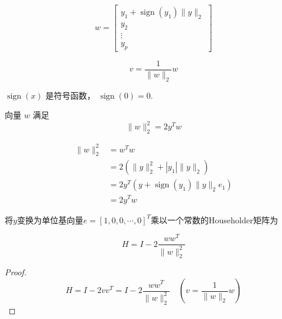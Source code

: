 \begin{definition}
    \begin{equation}w=\left[\begin{array}{c}
        y_{1}+\operatorname{sign}\left(y_{1}\right)\|y\|_{2} \\
        y_{2} \\
        \vdots \\
        y_{p}
        \end{array}\right]\end{equation}

    \begin{equation}v=\frac{1}{\|w\|_{2}} w\end{equation}

    $\operatorname{sign}(x)$ 是符号函数， $\operatorname{sign}(0)=0$.
\end{definition}

\begin{theorem}
    向量 $ w $ 满足 \begin{equation} \|w\|_{2}^{2}=2 y^{T} w \end{equation}
\end{theorem}

\begin{equation}
\begin{aligned}
    \|w\|_{2}^{2}&=w^{T} w\\
    &=2\left(\|y\|_{2}^{2}+\left|y_{1}\right|\|y\|_{2}\right)\\
    &=2 y^{T}\left(y+\operatorname{sign}\left(y_{1}\right)\|y\|_{2} e_{1}\right)\\
    &=2 y^{T} w 
\end{aligned}
\end{equation}

\begin{definition}
将$y$变换为单位基向量$e=[1,0,0,\cdots,0]^T$乘以一个常数的Householder矩阵为

    \begin{equation} H=I-2 \frac{w w^{T}}{\|w\|_{2}^{2}} \end{equation}
\end{definition}

\begin{proof}
    \begin{equation} H=I-2 v v^{T}=I-2 \frac{w w^{T}}{\|w\|_{2}^{2}} \quad(v=\frac{1}{\|w\|_{2}} w) \end{equation}
\end{proof}

